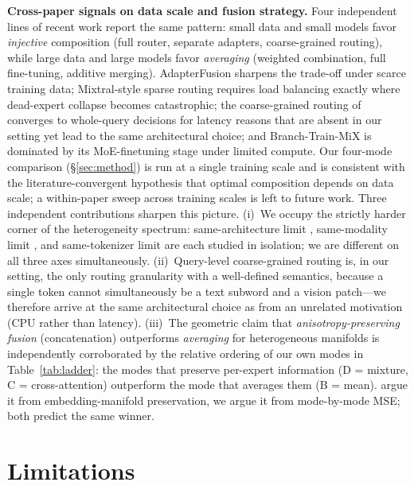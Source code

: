 \documentclass[10pt,twoside]{article}
\theoremstyle{definition}
\begin{document}
\textbf{Cross-paper signals on data scale and fusion strategy.} Four independent lines of recent work report the same pattern: small data and small models favor \emph{injective} composition (full router, separate adapters, coarse-grained routing), while large data and large models favor \emph{averaging} (weighted combination, full fine-tuning, additive merging). AdapterFusion \citep{pfeiffer2021} sharpens the trade-off under scarce training data; Mixtral-style sparse routing \citep{jiang2024mixtral} requires load balancing exactly where dead-expert collapse becomes catastrophic; the coarse-grained routing of \citet{liu2026orchestrating} converges to whole-query decisions for latency reasons that are absent in our setting yet lead to the same architectural choice; and Branch-Train-MiX \citep{sukhbaatar2024btx} is dominated by its MoE-finetuning stage under limited compute. Our four-mode comparison (\S\ref{sec:method}) is run at a single training scale and is consistent with the literature-convergent hypothesis that optimal composition depends on data scale; a within-paper sweep across training scales is left to future work. Three independent contributions sharpen this picture. (i)~We occupy the strictly harder corner of the heterogeneity spectrum: same-architecture limit \citep{komatsuzaki2023,sukhbaatar2024btx,puigcerver2024softmoe}, same-modality limit \citep{wang2024scalekd}, and same-tokenizer limit \citep{wang2025symphony,liu2026orchestrating} are each studied in isolation; we are different on all three axes simultaneously. (ii)~Query-level coarse-grained routing is, in our setting, the only routing granularity with a well-defined semantics, because a single token cannot simultaneously be a text subword and a vision patch---we therefore arrive at the same architectural choice as \citet{liu2026orchestrating} from an unrelated motivation (CPU rather than latency). (iii)~The geometric claim that \emph{anisotropy-preserving fusion} (concatenation) outperforms \emph{averaging} for heterogeneous manifolds is independently corroborated by the relative ordering of our own modes in Table~\ref{tab:ladder}: the modes that preserve per-expert information (D = mixture, C = cross-attention) outperform the mode that averages them (B = mean). \citet{liu2026orchestrating} argue it from embedding-manifold preservation, we argue it from mode-by-mode MSE; both predict the same winner.

\section{Limitations}
\label{sec:limitations}
\end{document}
